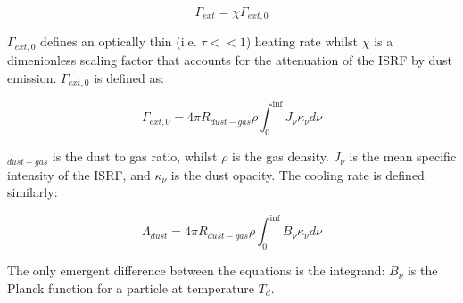 \documentclass{report}
\begin{document}
\begin{equation}
  \Gamma_{ext} = \chi \Gamma_{ext,0}
\end{equation}

$\Gamma_{ext,0}$ defines an optically thin (i.e. $\tau<<1$) heating rate whilst $\chi$ is a dimenionless scaling factor that accounts for the attenuation of the ISRF by dust emission. $\Gamma_{ext,0}$ is defined as:

\begin{equation}
  \Gamma_{ext,0} = 4\pi R_{dust-gas} \rho \int_{0}^{\inf} J_{\nu} \kappa_{\nu} d\nu
\end{equation}

$_{dust-gas}$ is the dust to gas ratio, whilst $\rho$ is the gas density. $J_{\nu}$ is the mean specific intensity of the ISRF, and $\kappa_{\nu}$ is the dust opacity. The cooling rate is defined similarly:

\begin{equation}
  \Lambda_{dust} = 4\pi R_{dust-gas} \rho \int_{0}^{\inf} B_{\nu} \kappa_{\nu} d\nu
\end{equation}

The only emergent difference between the equations is the integrand: $B_{\nu}$ is the Planck function for a particle at temperature $T_{d}$.


\printbibliography


\end{document}
